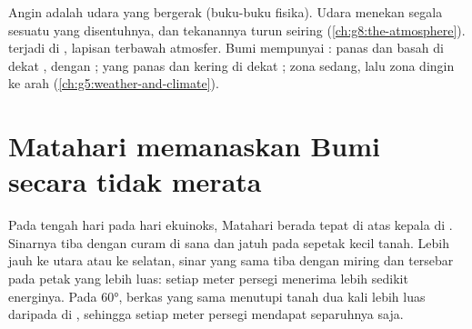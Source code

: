 \begin{recall}
Angin adalah udara yang bergerak (buku-buku fisika). Udara menekan segala
sesuatu yang disentuhnya, dan tekanannya turun seiring 
(\cref{ch:g8:the-atmosphere}).  terjadi di , lapisan
terbawah atmosfer. Bumi mempunyai : panas dan basah di
dekat , dengan ;  yang panas dan kering di
dekat ; zona sedang, lalu zona dingin ke arah 
(\cref{ch:g5:weather-and-climate}).
\end{recall}

\section{Matahari memanaskan Bumi secara tidak merata}

Pada tengah hari pada hari ekuinoks, Matahari berada tepat di atas kepala
di . Sinarnya tiba dengan curam di sana dan jatuh pada sepetak
kecil tanah. Lebih jauh ke utara atau ke selatan, sinar yang sama tiba
dengan miring dan tersebar pada petak yang lebih luas: setiap meter
persegi menerima lebih sedikit energinya. Pada  \ang{60}, berkas
yang sama menutupi tanah dua kali lebih luas daripada di ,
sehingga setiap meter persegi mendapat separuhnya saja.


